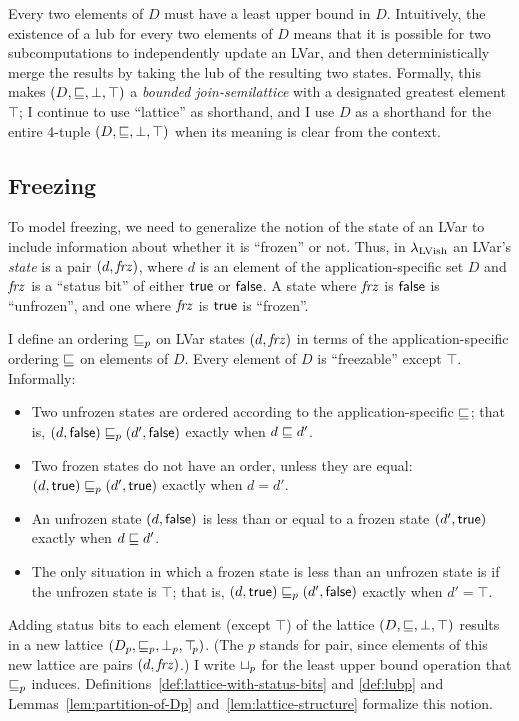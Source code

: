 Every two elements of $D$ must have a least upper bound in $D$.
Intuitively, the existence of a lub for every two elements of $D$
means that it is possible for two subcomputations to independently
update an LVar, and then deterministically merge the results by taking
the lub of the resulting two states.  Formally, this makes $(D,
\sqsubseteq, \bot, \top)$ a \emph{bounded join-semilattice} with a
designated greatest element $\top$; I continue to use ``lattice'' as
shorthand, and I use $D$ as a shorthand for the entire 4-tuple $(D,
\sqsubseteq, \bot, \top)$ when its meaning is clear from the context.

\subsection{Freezing}

To model freezing, we need to generalize the notion of the state of an
LVar to include information about whether it is ``frozen'' or not.
Thus, in $\lambda_{\textrm{LVish}}$ an LVar's \emph{state} is a pair
$(d, \mathit{frz})$, where $d$ is an element of the
application-specific set $D$ and $\mathit{frz}$ is a ``status bit'' of
either $\textsf{true}$ or $\textsf{false}$.  A state where $\mathit{frz}$ is
$\textsf{false}$ is ``unfrozen'', and one where $\mathit{frz}$ is
$\textsf{true}$ is ``frozen''.

I define an ordering $\sqsubseteq_p$ on LVar states $(d, \mathit{frz})$ in
terms of the application-specific ordering $\sqsubseteq$ on elements of
$D$.  Every element of $D$ is ``freezable'' except $\top$.
Informally:
\begin{itemize}
\item Two unfrozen states are ordered according to the
  application-specific $\sqsubseteq$; that is, $(d, \textsf{false})
  \sqsubseteq_p (d', \textsf{false})$ exactly when $d \sqsubseteq d'$.
\item Two frozen states do not have an order, unless they are equal:
  $(d, \textsf{true}) \sqsubseteq_p (d', \textsf{true})$ exactly when
  $d = d'$.
\item An unfrozen state $(d, \textsf{false})$ is less than or
  equal to a frozen state $(d', \textsf{true})$ exactly when $d
  \sqsubseteq d'$.
\item The only situation in which a frozen state is less than an
  unfrozen state is if the unfrozen state is $\top$; that is,
  $(d, \textsf{true}) \sqsubseteq_p (d', \textsf{false})$ exactly when
  $d' = \top$.
\end{itemize}
Adding status bits to each element (except $\top$) of the lattice $(D,
\sqsubseteq, \bot, \top)$ results in a new lattice $(D_p, \sqsubseteq_p, \bot_{p},
\top\hspace{-0.85mm}_{p})$.  (The $p$ stands for pair, since elements of this new lattice
are pairs $(d, \mathit{frz})$.) I write $ \sqcup_p $ for the least
upper bound operation that $\sqsubseteq_p$ induces.
Definitions~\ref{def:lattice-with-status-bits} and \ref{def:lubp} and
Lemmas~\ref{lem:partition-of-Dp} and~\ref{lem:lattice-structure}
formalize this notion.

